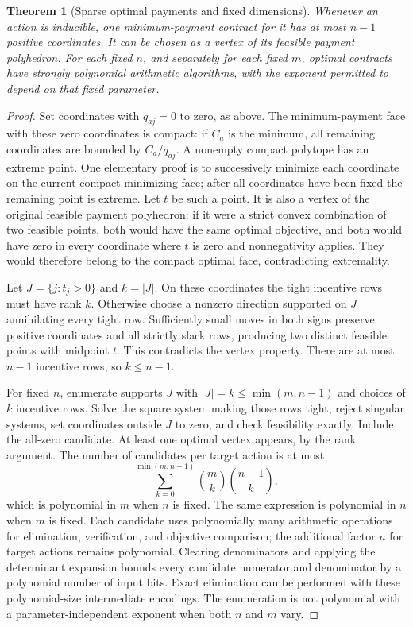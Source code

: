 \documentclass[11pt,a4paper]{article}
\newtheorem{theorem}{Theorem}[section]
\theoremstyle{definition}\newtheorem{definition}[theorem]{Definition}
\theoremstyle{remark}\newtheorem{remark}[theorem]{Remark}
\newcommand{\1}{\mathbf 1}
\begin{document}
\begin{theorem}[Sparse optimal payments and fixed dimensions]\label{thm:sparse}
Whenever an action is inducible, one minimum-payment contract for it has at most $n-1$ positive coordinates. It can be chosen as a vertex of its feasible payment polyhedron. For each fixed $n$, and separately for each fixed $m$, optimal contracts have strongly polynomial arithmetic algorithms, with the exponent permitted to depend on that fixed parameter.
\end{theorem}
\begin{proof}
Set coordinates with $q_{aj}=0$ to zero, as above. The minimum-payment face with these zero coordinates is compact: if $C_a$ is the minimum, all remaining coordinates are bounded by $C_a/q_{aj}$. A nonempty compact polytope has an extreme point. One elementary proof is to successively minimize each coordinate on the current compact minimizing face; after all coordinates have been fixed the remaining point is extreme. Let $t$ be such a point. It is also a vertex of the original feasible payment polyhedron: if it were a strict convex combination of two feasible points, both would have the same optimal objective, and both would have zero in every coordinate where $t$ is zero and nonnegativity applies. They would therefore belong to the compact optimal face, contradicting extremality.

Let $J=\{j:t_j>0\}$ and $k=|J|$. On these coordinates the tight incentive rows must have rank $k$. Otherwise choose a nonzero direction supported on $J$ annihilating every tight row. Sufficiently small moves in both signs preserve positive coordinates and all strictly slack rows, producing two distinct feasible points with midpoint $t$. This contradicts the vertex property. There are at most $n-1$ incentive rows, so $k\le n-1$.

For fixed $n$, enumerate supports $J$ with $|J|=k\le\min(m,n-1)$ and choices of $k$ incentive rows. Solve the square system making those rows tight, reject singular systems, set coordinates outside $J$ to zero, and check feasibility exactly. Include the all-zero candidate. At least one optimal vertex appears, by the rank argument. The number of candidates per target action is at most
\[
 \sum_{k=0}^{\min(m,n-1)}\binom{m}{k}\binom{n-1}{k},
\]
which is polynomial in $m$ when $n$ is fixed. The same expression is polynomial in $n$ when $m$ is fixed. Each candidate uses polynomially many arithmetic operations for elimination, verification, and objective comparison; the additional factor $n$ for target actions remains polynomial. Clearing denominators and applying the determinant expansion bounds every candidate numerator and denominator by a polynomial number of input bits. Exact elimination can be performed with these polynomial-size intermediate encodings. The enumeration is not polynomial with a parameter-independent exponent when both $n$ and $m$ vary.
\end{proof}
\end{document}
